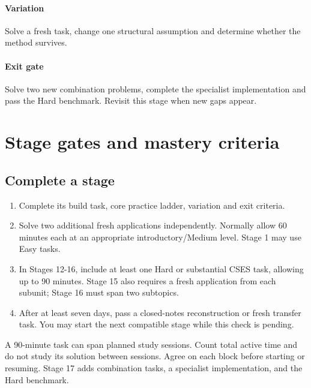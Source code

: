 \documentclass[11pt,letterpaper]{article}
\begin{document}
\paragraph*{Variation}

Solve a fresh task, change one structural assumption and determine whether the method survives.

\paragraph*{Exit gate}

Solve two new combination problems, complete the specialist implementation and pass the Hard benchmark. Revisit this stage when new gaps appear.

\section{Stage gates and mastery criteria}\label{sec:22}

\subsection*{Complete a stage}

\begin{enumerate}

\item Complete its build task, core practice ladder, variation and exit criteria.

\item Solve two additional fresh applications independently. Normally allow 60 minutes each at an appropriate introductory/Medium level. Stage 1 may use Easy tasks.

\item In Stages 12-16, include at least one Hard or substantial CSES task, allowing up to 90 minutes. Stage 15 also requires a fresh application from each subunit; Stage 16 must span two subtopics.

\item After at least seven days, pass a closed-notes reconstruction or fresh transfer task. You may start the next compatible stage while this check is pending.

\end{enumerate}

A 90-minute task can span planned study sessions. Count total active time and do not study its solution between sessions. Agree on each block before starting or resuming. Stage 17 adds combination tasks, a specialist implementation, and the Hard benchmark.
\end{document}
